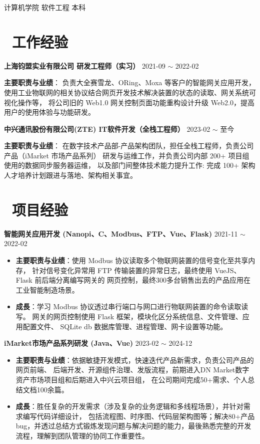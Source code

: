 \documentclass[10pt, a4paper]{article}
\begin{document}
计算机学院 \quad 软件工程 \quad 本科

\section{\color{CVBlue}\faBriefcase\ 工作经验}

\textbf{上海钧盟实业有限公司 \quad 研发工程师（实习）} \hfill 2021-09 $\sim$ 2022-02

\textbf{主要职责与业绩}： \quad 负责大全赛雪龙、ORing、Moxa 等客户的智能网关应用开发，
使用工业物联网的相关协议结合网页开发技术解决装置的状态的读取、网关系统可视化操作等，
将公司旧的 Web1.0 网关控制页面功能重构设计升级 Web2.0，提高用户的使用体验与功能研发。

\textbf{中兴通讯股份有限公司(ZTE) \quad IT软件开发（全栈工程师）} \hfill 2023-02 $\sim$ 至今

\textbf{主要职责与业绩}： \quad 在数字技术产品部-产品架构团队，担任全栈工程师，负责公司产品（iMarket 市场产品系列）
研发与运维工作，并负责公司内部 200+ 项目组使用的数据同步服务器运维，
以及部门间整体技术能力提升工作: 完成 100+ 架构人才培养计划跟进与落地、架构相关事宜。


\section{\color{CVBlue}\faUsers\ 项目经验}

\textbf{智能网关应用开发 (Nanopi、C、Modbus、FTP、Vue、Flask)} \hfill 2021-11 $\sim$ 2022-02

\begin{itemize}[parsep=0.5ex]
\item \textbf{主要职责与业绩}：使用 Modbus 协议读取多个物联网装置的信号变化至共享内存，
针对信号变化异常用 FTP 传输装置的异常日志，最终使用 VueJS、Flask 前后端分离编写网关的
网页控制，最终300多台销售出去的产品应用在工业智能制造场景。

\item \textbf{成長}：学习 Modbus 协议透过串行端口与网口进行物联网装置的命令读取读写。
网关的网页控制使用 Flask 框架，模块化区分系统信息、文件管理、应用配置文件、
SQLite db 数据库管理、进程管理、网卡设置等功能。
\end{itemize}

\textbf{ iMarket市场产品系列研发 (Java、Vue)} \hfill 2023-02 $\sim$ 2024-12

\begin{itemize}[parsep=0.5ex]
\item \textbf{主要职责与业绩}：依据敏捷开发模式，快速迭代产品新需求，负责公司产品的网页前端、
后端开发、开源组件治理、发版流程，前期进入DN Market数字资产市场项目组和后期进入中兴云项目组，
在公司期间完成50+需求、个人总结文档100余篇。

\item \textbf{成長}：胜任复杂的开发需求（涉及复杂的业务逻辑和多线程场景），并针对需求编写代码详细设计，
包括流程图、时序图、代码层架构图等；解决80+产品 bug，并透过总结方式锻炼发现问题与解决问题的能力，最後熟悉完整的开发流程，理解到团队管理的协同工作重要性。
\end{itemize}
\end{document}
